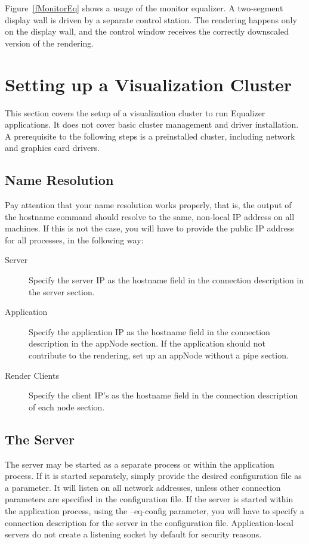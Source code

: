 \documentclass[10pt,a4]{scrartcl}
\newcommand{\fig}[1]{Figure~\ref{#1}}
\begin{document}
\fig{fMonitorEq} shows a usage of the monitor equalizer. A two-segment
display wall is driven by a separate control station. The rendering
happens only on the display wall, and the control window receives the
correctly downscaled version of the rendering.


\section{\label{sClusterSetup}Setting up a Visualization Cluster}
This section covers the setup of a visualization cluster to run Equalizer
applications. It does not cover basic cluster management and driver
installation. A prerequisite to the following steps is a preinstalled cluster,
including network and graphics card drivers.

\subsection{Name Resolution}
Pay attention that your name resolution works properly, that is, the output of
the hostname command should resolve to the same, non-local IP address on all
machines. If this is not the case, you will have to provide the public IP
address for all processes, in the following way:
\begin{description}
\item[Server] Specify the server IP as the hostname field in the connection
  description in the server section.
\item[Application] Specify the application IP as the hostname field in the
  connection description in the appNode section. If the application should not
  contribute to the rendering, set up an appNode without a pipe section.
\item[Render Clients] Specify the client IP's as the hostname field in the
  connection description of each node section.
\end{description}

\subsection{The Server}
The server may be started as a separate process or within the application
process. If it is started separately, simply provide the desired configuration
file as a parameter. It will listen on all network addresses, unless other
connection parameters are specified in the configuration file. If the
server is started within the application process, using the \textsf{--eq-config}
parameter, you will have to specify a connection description for the server in
the configuration file. Application-local servers do not create a listening
socket by default for security reasons.
\end{document}
